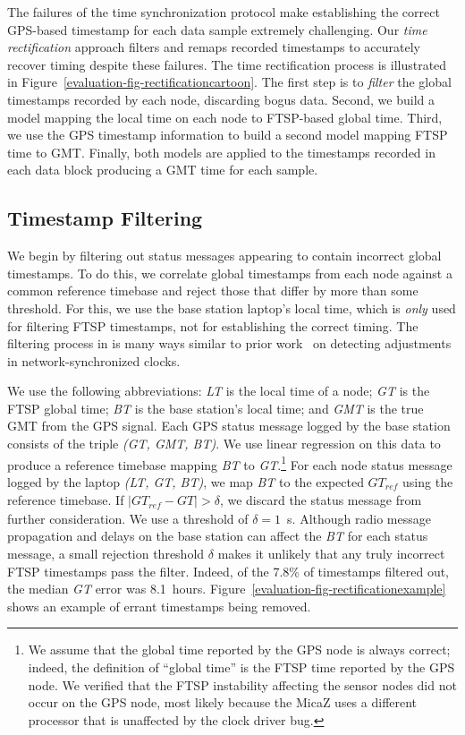 The failures of the time synchronization protocol make establishing the
correct GPS-based timestamp for each data sample extremely challenging. Our
\textit{time rectification} approach filters and remaps recorded timestamps
to accurately recover timing despite these failures. The time rectification
process is illustrated in Figure~\ref{evaluation-fig-rectificationcartoon}.
The first step is to \textit{filter} the global timestamps recorded by each
node, discarding bogus data. Second, we build a model mapping the local time
on each node to FTSP-based global time. Third, we use the GPS timestamp
information to build a second model mapping FTSP time to GMT. Finally, both
models are applied to the timestamps recorded in each data block producing a
GMT time for each sample.

\subsection{Timestamp Filtering}
\label{evaluation-subsection-filtering}

We begin by filtering out status messages appearing to contain incorrect
global timestamps. To do this, we correlate global timestamps from each node
against a common reference timebase and reject those that differ by more than
some threshold. For this, we use the base station laptop's local time, which
is \textit{only} used for filtering FTSP timestamps, not for establishing the
correct timing. The filtering process in is many ways similar to prior
work~\cite{paxson98calibrating,1028824} on detecting adjustments in
network-synchronized clocks.

We use the following abbreviations: \textit{LT} is the local time of a node;
\textit{GT} is the FTSP global time; \textit{BT} is the base station's local
time; and \textit{GMT} is the true GMT from the GPS signal. Each GPS status
message logged by the base station consists of the triple \textit{(GT, GMT,
BT)}. We use linear regression on this data to produce a reference timebase
mapping \textit{BT} to \textit{GT}.\footnote{We assume that the global time
reported by the GPS node is always correct; indeed, the definition of
``global time'' is the FTSP time reported by the GPS node. We verified that
the FTSP instability affecting the sensor nodes did not occur on the GPS
node, most likely because the MicaZ uses a different processor that is
unaffected by the clock driver bug.} For each node status message logged by
the laptop \textit{(LT, GT, BT)}, we map \textit{BT} to the expected
$\mathit{GT}_{\mathit{ref}}$ using the reference timebase. If $ \mid
\mathit{GT}_{\mathit{ref}} - \mathit{GT} \mid > \delta$, we discard the
status message from further consideration. We use a threshold of $\delta =
1$~s. Although radio message propagation and delays on the base station can
affect the \textit{BT} for each status message, a small rejection threshold
$\delta$ makes it unlikely that any truly incorrect FTSP timestamps pass the
filter. Indeed, of the 7.8\% of timestamps filtered out, the median
\textit{GT} error was 8.1~hours.
Figure~\ref{evaluation-fig-rectificationexample} shows an example of errant
timestamps being removed.


